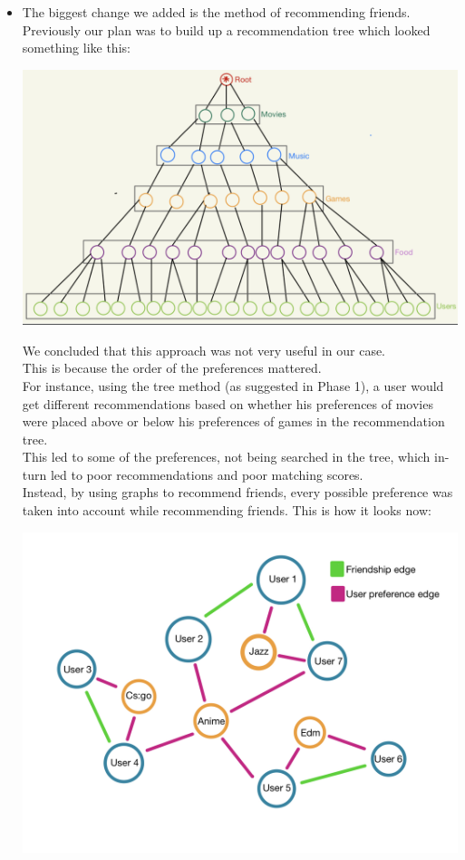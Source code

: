 \documentclass[11pt]{report}
\begin{document}
\begin{itemize}
    \item The biggest change we added is the method of recommending friends. Previously our plan was to build up a recommendation tree which looked something like this:
    
    \begin{center}
             \includegraphics[scale = .5]{Images/tree.png} 
      \end{center}
    
    We concluded that this approach was not very useful in our case.\\
    
    This is because the order of the preferences mattered. \\
    
    For instance, using the tree method (as suggested in Phase 1), a user would get different recommendations based on whether his preferences of movies were placed above or below his preferences of games in the recommendation tree. \\
    
    This led to some of the preferences, not being searched in the tree, which  in-turn led to poor recommendations and poor matching scores. \\
    
    Instead, by using graphs to recommend friends, every possible preference was taken into account while recommending friends. This is how it looks now:
    
    \includegraphics[scale = .2]{Images/graph.jpeg}
    

\end{itemize}
\end{document}
